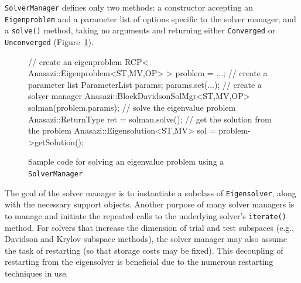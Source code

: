 \documentclass[acmtoms]{acmtrans2m}
\newcommand{\aspace}[1]{\texttt{#1}}
\begin{document}
\aspace{SolverManager} defines only two methods: a constructor
accepting an \aspace{Eigenproblem} and a parameter list of
options specific to the solver manager; and a \verb!solve()! method, taking no
arguments and returning either \aspace{Converged} or
\aspace{Unconverged} (Figure~\ref{fig:examplesolve}).

\begin{figure}[htb]
\begin{center}
\begin{boxedverbatim}
// create an eigenproblem
RCP< Anasazi::Eigenproblem<ST,MV,OP> > problem = ...;
// create a parameter list
ParameterList params;
params.set(...);
// create a solver manager
Anasazi::BlockDavidsonSolMgr<ST,MV,OP> solman(problem,params);
// solve the eigenvalue problem
Anasazi::ReturnType ret = solman.solve();
// get the solution from the problem
Anasazi::Eigensolution<ST,MV> sol = problem->getSolution();
\end{boxedverbatim}
\end{center}
\caption{Sample code for solving an eigenvalue problem using a \aspace{SolverManager}}
\label{fig:examplesolve}
\end{figure}

The goal of the solver manager is to instantiate a subclass of \aspace{Eigensolver}, along
with the necessary support objects. Another purpose of many solver managers is to manage
and initiate the repeated calls to the underlying solver's \verb!iterate()! method. For
solvers that increase the dimension of trial and test subspaces (e.g., Davidson and Krylov
subspace methods), the solver manager may also assume the task of restarting (so that
storage costs may be fixed). This decoupling of restarting from the eigensolver is
beneficial due to the numerous restarting techniques in use.

\end{document}
